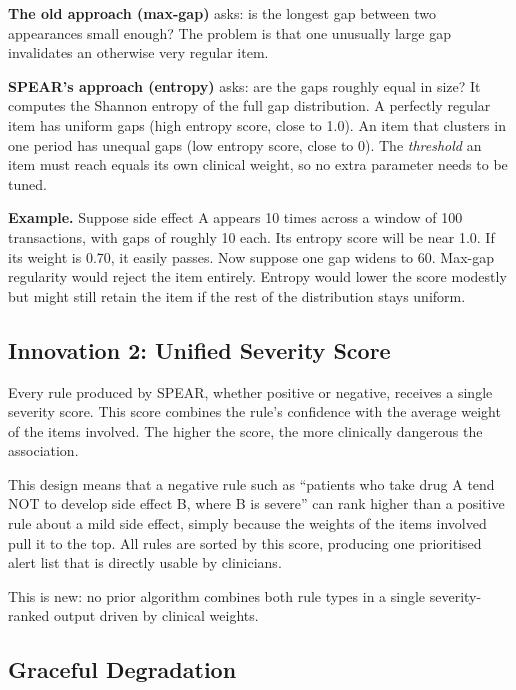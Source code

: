 \documentclass[10pt,twocolumn]{article}
\begin{document}
\textbf{The old approach (max-gap)} asks: is the longest gap between
two appearances small enough? The problem is that one unusually large
gap invalidates an otherwise very regular item.

\textbf{SPEAR's approach (entropy)} asks: are the gaps roughly
equal in size? It computes the Shannon entropy of the full gap
distribution. A perfectly regular item has uniform gaps (high entropy
score, close to 1.0). An item that clusters in one period has unequal
gaps (low entropy score, close to 0). The \emph{threshold} an item
must reach equals its own clinical weight, so no extra parameter
needs to be tuned.

\begin{tcolorbox}[notebox]
\textbf{Example.} Suppose side effect A appears 10 times across a
window of 100 transactions, with gaps of roughly 10 each. Its entropy
score will be near 1.0. If its weight is 0.70, it easily passes.
Now suppose one gap widens to 60. Max-gap regularity would reject the
item entirely. Entropy would lower the score modestly but might still
retain the item if the rest of the distribution stays uniform.
\end{tcolorbox}

\subsection{Innovation 2: Unified Severity Score}

Every rule produced by SPEAR, whether positive or negative, receives
a single severity score. This score combines the rule's confidence
with the average weight of the items involved. The higher the score,
the more clinically dangerous the association.

This design means that a negative rule such as ``patients who take
drug A tend NOT to develop side effect B, where B is severe'' can
rank higher than a positive rule about a mild side effect, simply
because the weights of the items involved pull it to the top. All
rules are sorted by this score, producing one prioritised alert list
that is directly usable by clinicians.

This is new: no prior algorithm combines both rule types in a single
severity-ranked output driven by clinical weights.

\subsection{Graceful Degradation}
\end{document}
